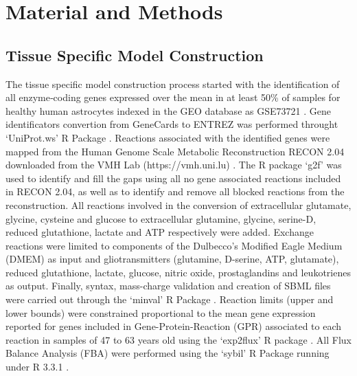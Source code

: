 \section{Material and Methods}
\subsection*{Tissue Specific Model Construction}
The tissue specific model construction process started with the identification of all enzyme‐coding genes expressed over the mean in at least 50\% of samples for healthy human astrocytes indexed in the GEO database \cite{Edgar2002} as GSE73721 \citep{Zhang2016}. Gene identificators convertion from GeneCards\cite{rebhan1997genecards} to ENTREZ \cite{maglott2005entrez} was performed throught `UniProt.ws' R Package \cite{Carlson2016}. Reactions associated with the identified genes were mapped from the Human Genome Scale  Metabolic Reconstruction RECON 2.04 downloaded from the VMH Lab (https://vmh.uni.lu) \cite{thiele2013community}. The R package `g2f' \cite{G2F} was used to identify and fill the gaps using all no gene associated reactions included in RECON 2.04, as well as to identify and remove all blocked reactions  from the reconstruction. All reactions involved in the conversion of extracellular glutamate, glycine, cysteine and glucose to extracellular glutamine, glycine, serine-D, reduced glutathione, lactate and ATP respectively were added. Exchange reactions were limited to components of the Dulbecco's Modified Eagle Medium (DMEM) as input and gliotransmitters (glutamine, D-serine, ATP, glutamate), reduced glutathione, lactate, glucose, nitric oxide, prostaglandins and leukotrienes as output. Finally, syntax, mass-charge validation and creation of SBML files were carried out through the `minval' R Package \cite{MINVAL}. Reaction limits (upper and lower bounds) were constrained proportional to the mean gene expression reported for genes included in Gene-Protein-Reaction (GPR) \cite{Thiele2010} associated to each reaction in samples of 47 to 63 years old using the `exp2flux' R package \cite{EXP2FLUX}. All Flux Balance Analysis (FBA) were performed using the `sybil' \cite{Gelius-Dietrich2013} R Package running under R 3.3.1 \cite{RCoreTeam2016}.
